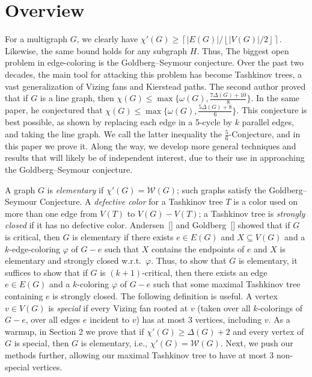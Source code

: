 \documentclass[12pt]{amsart}
\theoremstyle{plain}
\theoremstyle{definition}
\theoremstyle{remark}
\newcommand{\fancy}[1]{\mathcal{#1}}
\newcommand{\W}{\fancy{W}}
\newcommand{\ceil}[1]{\left\lceil#1\right\rceil}
\newcommand{\floor}[1]{\left\lfloor#1\right\rfloor}
\newcommand{\vph}{\varphi}
\begin{document}
\section{Overview}

For a multigraph $G$, we clearly have $\chi'(G)\ge
\ceil{|E(G)|/\floor{|V(G)|/2}}$.  Likewise, the same bound holds for any
subgraph $H$.  Thus, 
The biggest open problem in edge-coloring is the Goldberg--Seymour conjecture.
Over the past two decades, the main tool for attacking this problem has become
Tashkinov trees, a vast generalization of Vizing fans and Kierstead paths.
The second author proved that if $G$ is a line graph, then $\chi(G)\le
\max\{\omega(G),\frac{7\Delta(G)+10}{8}\}$.  In the same paper, he conjectured
that $\chi(G)\le \max\{\omega(G),\frac{5\Delta(G)+8}{6}\}$. This conjecture is best
possible, as shown by replacing each edge in a 5-cycle by $k$ parallel edges,
and taking the line graph.
We call the latter inequality the $\frac56$-Conjecture, and in this paper we prove
it.  Along the way, we develop more general techniques and results that will
likely be of independent interest, due to their use in approaching the
Goldberg--Seymour conjecture.

A graph $G$ is \emph{elementary} if $\chi'(G)=\W(G)$; such graphs satisfy the
Goldberg--Seymour Conjecture.  
A
\emph{defective color}
for a Tashkinov tree $T$ is a color used on more than one edge from $V(T)$ to
$V(G)-V(T)$; a Tashkinov tree is \emph{strongly closed} if it has no defective
color.  Andersen~[] and Goldberg~[] showed that if $G$ is critical, then $G$ is
elementary if there exists $e\in E(G)$ and $X\subseteq V(G)$ and a
$k$-edge-coloring $\vph$ of $G-e$ such that $X$ contains the endpoints of $e$
and $X$ is elementary and strongly closed w.r.t.~$\vph$.  Thus, to show that $G$
is elementary, it suffices to show that if $G$ is $(k+1)$-critical, then there
exists an edge $e\in E(G)$ and a $k$-coloring $\vph$ of $G-e$ such that some
maximal Tashkinov tree containing $e$ is strongly closed.  The following
definition is useful.  
A vertex $v \in V(G)$ is \emph{special} if every Vizing fan rooted at $v$ (taken over all
$k$-colorings of $G-e$, over all edges $e$ incident to $v$) has at most 3 vertices,
including $v$.
As a warmup, in Section 2 we prove that if $\chi'(G)\ge \Delta(G)+2$ and every
vertex of $G$ is special, then $G$ is elementary, i.e., $\chi'(G)=\W(G)$.  Next,
we push our methods further, allowing our maximal Tashkinov tree to have at most
3 non-special vertices.
\end{document}
